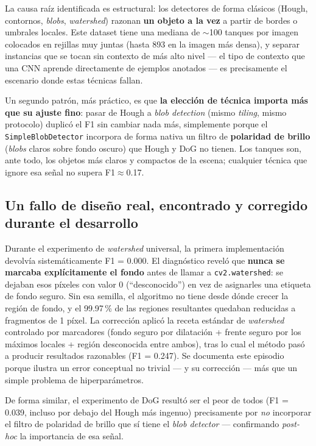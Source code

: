 \documentclass[11pt,a4paper]{article}
\begin{document}
La causa raíz identificada es estructural: los detectores de forma clásicos (Hough,
contornos, \emph{blobs}, \emph{watershed}) razonan \textbf{un objeto a la vez} a
partir de bordes o umbrales locales. Este dataset tiene una mediana de $\sim$100
tanques por imagen colocados en rejillas muy juntas (hasta 893 en la imagen más
densa), y separar instancias que se tocan sin contexto de más alto nivel --- el tipo
de contexto que una CNN aprende directamente de ejemplos anotados --- es precisamente
el escenario donde estas técnicas fallan.

Un segundo patrón, más práctico, es que \textbf{la elección de técnica importa más
que su ajuste fino}: pasar de Hough a \emph{blob detection} (mismo \emph{tiling},
mismo protocolo) duplicó el F1 sin cambiar nada más, simplemente porque el
\texttt{SimpleBlobDetector} incorpora de forma nativa un filtro de \textbf{polaridad
de brillo} (\emph{blobs} claros sobre fondo oscuro) que Hough y DoG no tienen. Los
tanques son, ante todo, los objetos más claros y compactos de la escena; cualquier
técnica que ignore esa señal no supera F1$\approx$0.17.

\subsection{Un fallo de diseño real, encontrado y corregido durante el desarrollo}
\label{sec:bug}

Durante el experimento de \emph{watershed} universal, la primera implementación
devolvía sistemáticamente F1 = 0.000. El diagnóstico reveló que \textbf{nunca se
marcaba explícitamente el fondo} antes de llamar a \texttt{cv2.watershed}: se dejaban
esos píxeles con valor 0 (``desconocido'') en vez de asignarles una etiqueta de fondo
seguro. Sin esa semilla, el algoritmo no tiene desde dónde crecer la región de fondo,
y el 99.97\,\% de las regiones resultantes quedaban reducidas a fragmentos de 1
píxel. La corrección aplicó la receta estándar de \emph{watershed} controlado por
marcadores (fondo seguro por dilatación + frente seguro por los máximos locales +
región desconocida entre ambos), tras lo cual el método pasó a producir resultados
razonables (F1 = 0.247). Se documenta este episodio porque ilustra un error
conceptual no trivial --- y su corrección --- más que un simple problema de
hiperparámetros.

De forma similar, el experimento de DoG resultó ser el peor de todos (F1 = 0.039,
incluso por debajo del Hough más ingenuo) precisamente por \emph{no} incorporar el
filtro de polaridad de brillo que sí tiene el \emph{blob detector} --- confirmando
\emph{post-hoc} la importancia de esa señal.
\end{document}
